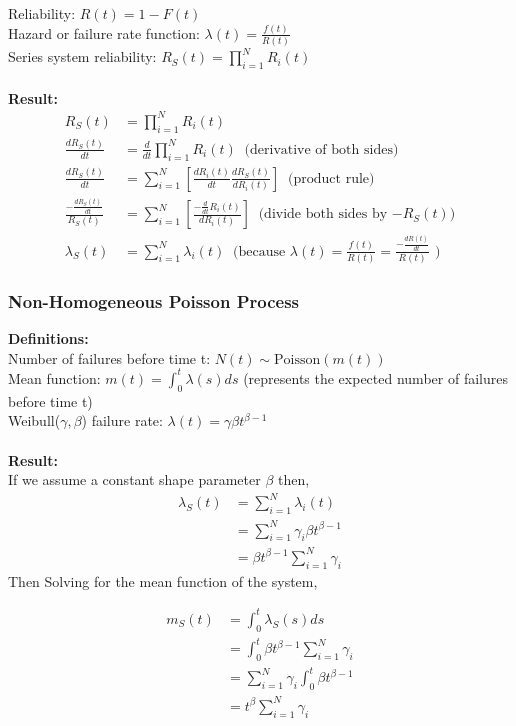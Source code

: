 \documentclass[12pt]{article}
\begin{document}
Reliability: $R(t) = 1 - F(t)$ \\
Hazard or failure rate function: $\lambda(t) = \frac{f(t)}{R(t)}$ \\
Series system reliability: $R_S(t) = \prod_{i = 1}^N R_i(t)$
\\
\\
\textbf{Result:}
$$
\begin{aligned}
	R_S(t) &= \prod_{i = 1}^N R_i(t) \\
	\frac{dR_S(t)}{dt} &= \frac{d}{dt} \prod_{i = 1}^N R_i(t) \; \; \text{(derivative of both sides)} \\
	\frac{dR_S(t)}{dt} &= \sum_{i=1}^N \left[ \frac{dR_i(t)}{dt} \frac{dR_S(t)}{dR_i(t)} \right] \; \; \text{(product rule)} \\
    \frac{-\frac{dR_S(t)}{dt}}{R_S(t)} &= \sum_{i=1}^N \left[  \frac{-\frac{d}{dt}R_i(t)}{dR_i(t)} \right] \; \; \text{(divide both sides by $-R_S(t)$)} \\
    \lambda_S(t) &= \sum_{i = 1}^N \lambda_i(t) \; \; \text{(because $\lambda(t) = \frac{f(t)}{R(t)} = \frac{-\frac{dR(t)}{dt}}{R(t)}$ )}
\end{aligned}
$$

\subsubsection{Non-Homogeneous Poisson Process}

\textbf{Definitions:} \\
\noindent
Number of failures before time t: $N(t) \sim \text{Poisson}(m(t))$ \\
Mean function: $m(t) = \int_0^t \lambda(s)ds$ (represents the expected number of failures before time t) \\
Weibull($\gamma, \beta $) failure rate: $\lambda(t) = \gamma\beta t^{\beta - 1}$
\\
\\
\textbf{Result:}\\
If we assume a constant shape parameter $\beta$ then,\\
$$
\begin{aligned}
	\lambda_S(t) &= \sum_{i = 1}^N \lambda_i(t) \\
    &= \sum_{i = 1}^N \gamma_i\beta t^{\beta - 1} \\
    &= \beta t^{\beta -1} \sum_{i = 1}^N \gamma_i
\end{aligned}
$$
\newpage
Then Solving for the mean function of the system,

$$
\begin{aligned}
	m_S(t) &= \int_0^t \lambda_S(s)ds \\
    &= \int_0^t \beta t^{\beta -1} \sum_{i = 1}^N \gamma_i \\
    &= \sum_{i = 1}^N \gamma_i \int_0^t \beta t^{\beta -1} \\
    &= t^\beta \sum_{i = 1}^N \gamma_i
\end{aligned}
$$
\end{document}
